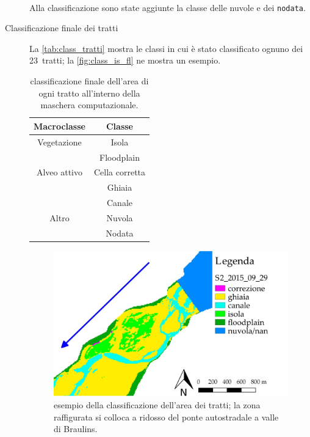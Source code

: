 \begin{description}
	\\
	Alla classificazione sono state aggiunte la classe delle nuvole e dei \texttt{nodata}.
	\item[Classificazione finale dei tratti] La \vref{tab:class_tratti} mostra le classi in cui è stato classificato ognuno dei 23~tratti; la \vref{fig:class_is_fl} ne mostra un esempio.
	\begin{table}[ht]
		\centering
		\begin{tabular}{
			c 
			c
			}
			\toprule
			\textbf{Macroclasse}	&	\textbf{Classe}	\\
			\midrule
			Vegetazione		&	Isola	\\
							&	Floodplain	\\
			Alveo attivo	&	Cella corretta	\\
							&	Ghiaia	\\
							&	Canale	\\
			Altro			&	Nuvola	\\
							&	Nodata	\\
			\bottomrule
		\end{tabular}
		\caption[classificazione dell'area dei tratti]{classificazione finale dell'area di ogni tratto all'interno della maschera computazionale.}
		\label{tab:class_tratti}
	\end{table}
	\begin{figure}[ht]
		\centering
		\includegraphics[width=.8\textwidth]{files/esempio_class_is_fl.jpeg}
		\caption[esempio della classificazione dell'area dei tratti]{esempio della classificazione dell'area dei tratti; la zona raffigurata si colloca a ridosso del ponte autostradale a valle di Braulins.}
		\label{fig:class_is_fl}
	\end{figure}


\end{description}
